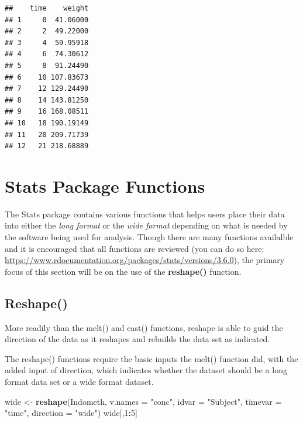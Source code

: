 \documentclass[]{book}
\newenvironment{Shaded}{\begin{snugshade}}{\end{snugshade}}
\newcommand{\DataTypeTok}[1]{\textcolor[rgb]{0.13,0.29,0.53}{#1}}
\newcommand{\DecValTok}[1]{\textcolor[rgb]{0.00,0.00,0.81}{#1}}
\newcommand{\KeywordTok}[1]{\textcolor[rgb]{0.13,0.29,0.53}{\textbf{#1}}}
\newcommand{\NormalTok}[1]{#1}
\newcommand{\OperatorTok}[1]{\textcolor[rgb]{0.81,0.36,0.00}{\textbf{#1}}}
\newcommand{\StringTok}[1]{\textcolor[rgb]{0.31,0.60,0.02}{#1}}
\begin{document}
\begin{verbatim}
##    time    weight
## 1     0  41.06000
## 2     2  49.22000
## 3     4  59.95918
## 4     6  74.30612
## 5     8  91.24490
## 6    10 107.83673
## 7    12 129.24490
## 8    14 143.81250
## 9    16 168.08511
## 10   18 190.19149
## 11   20 209.71739
## 12   21 218.68889
\end{verbatim}

\hypertarget{stats-package-functions}{%
\section{Stats Package Functions}\label{stats-package-functions}}

The Stats package contains various functions that helps users place their data into either the \emph{long format} or the \emph{wide format} depending on what is needed by the software being used for analysis. Though there are many functions availalble and it is encouraged that all functions are reviewed (you can do so here: \url{https://www.rdocumentation.org/packages/stats/versions/3.6.0}), the primary focus of this section will be on the use of the \textbf{reshape()} function.

\hypertarget{reshape}{%
\subsection{Reshape()}\label{reshape}}

More readily than the melt() and cast() functions, reshape is able to guid the direction of the data as it reshapes and rebuilds the data set as indicated.

The reshape() functions require the basic inputs the melt() function did, with the added input of direction, which indicates whether the dataset should be a long format data set or a wide format dataset.

\begin{Shaded}
\begin{Highlighting}[]
\NormalTok{wide <-}\StringTok{ }\KeywordTok{reshape}\NormalTok{(Indometh, }\DataTypeTok{v.names =} \StringTok{"conc"}\NormalTok{, }\DataTypeTok{idvar =} \StringTok{"Subject"}\NormalTok{,}
                \DataTypeTok{timevar =} \StringTok{"time"}\NormalTok{, }\DataTypeTok{direction =} \StringTok{"wide"}\NormalTok{)}
\NormalTok{wide[,}\DecValTok{1}\OperatorTok{:}\DecValTok{5}\NormalTok{]}
\end{Highlighting}
\end{Shaded}
\end{document}
